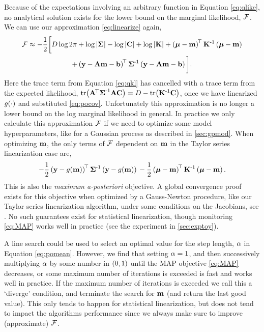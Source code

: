 \documentclass{article} %
\begin{document}
Because of the expectations involving an arbitrary function in Equation
\eqref{eq:qlike}, no analytical solution exists for the lower bound on the
marginal likelihood, $\mathcal{F}$. We can use our approximation
\eqref{eq:linearize} again,
\begin{multline}
    \mathcal{F} \approx - \frac{1}{2} \bigg[
    D\log{2\pi} + \log\left|{\boldsymbol{\Sigma}}\right| - \log\left|{\mathbf{C}}\right| + \log{\ensuremath{\left|{\mathbf{K}}\right|}}
    + \left({\boldsymbol{\mu} - \mathbf{m}}\right)^{\!\top}\mathbf{K}^{\text{-}1}
    \left({\boldsymbol{\mu} - \mathbf{m}}\right) \\
    + \left({\mathbf{y} - \mathbf{A}\mathbf{m} - \mathbf{b}}\right)^{\!\top}\boldsymbol{\Sigma}^{\text{-}1}
        \left({\mathbf{y} - \mathbf{A}\mathbf{m} - \mathbf{b}}\right)
        \bigg].
    \label{eq:approxfengy}
\end{multline}
Here the trace term from Equation \eqref{eq:qkl} has cancelled with a trace
term from the expected likelihood,
$\text{tr}\!\left({\mathbf{A}^{\!\top}\boldsymbol{\Sigma}^{\text{-}1}\mathbf{A}\mathbf{C}}\right) = D -
\text{tr}\!\left({\mathbf{K}^{\text{-}1}\mathbf{C}}\right)$, once we have linearized $g\!\left({{\cdot}}\right)$ and
substituted \eqref{eq:pocov}. Unfortunately this approximation is no longer a
lower bound on the log marginal likelihood in general. In practice we only
calculate this approximation $\mathcal{F}$ if we need to optimize some model
hyperparameters, like for a Gaussian process as described in
\autoref{sec:gpmod}. When optimizing $\mathbf{m}$, the only terms of $\mathcal{F}$
dependent on $\mathbf{m}$ in the Taylor series linearization case are,
\begin{equation}
    -\frac{1}{2} \left({\mathbf{y} - g\!\left({{\mathbf{m}}}\right)}\right)^{\!\top}
            \boldsymbol{\Sigma}^{\text{-}1}
            \left({\mathbf{y} - g\!\left({{\mathbf{m}}}\right)}\right) \\
    -\frac{1}{2}
    \left({\boldsymbol{\mu} - \mathbf{m}}\right)^{\!\top}\mathbf{K}^{\text{-}1}\left({\boldsymbol{\mu} - \mathbf{m}}\right).
    \label{eq:MAP}
\end{equation}
This is also the \emph{maximum a-posteriori} objective. A global convergence
proof exists for this objective when optimized by a Gauss-Newton procedure,
like our Taylor series linearization algorithm,  under some conditions on the
Jacobians, see \cite[p255]{Nocedal2006}. No such guarantees exist for
statistical linearization, though monitoring \eqref{eq:MAP} works well in
practice (see the experiment in \autoref{sec:exptoy}). 

A line search could be used to select an optimal value for the step length,
$\alpha$ in Equation \eqref{eq:pomean}. However, we find that setting $\alpha=1$,
and then successively multiplying $\alpha$ by some number in $\left({0, 1}\right)$ until
the MAP objective \eqref{eq:MAP} decreases, or some maximum number of
iterations is exceeded is fast and works well in practice. If the maximum
number of iterations is exceeded we call this a `diverge' condition, and
terminate the search for $\mathbf{m}$ (and return the last good value). This only
tends to happen for statistical linearization, but does not tend to impact the
algorithms performance since we always make sure to improve (approximate)
$\mathcal{F}$.
\end{document}
